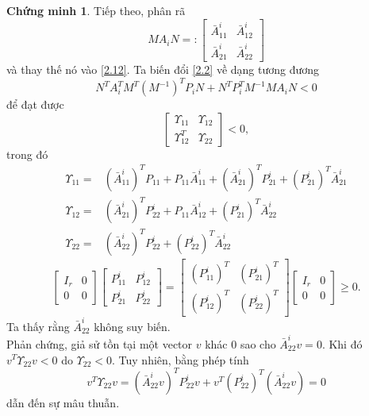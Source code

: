 \documentclass[12pt,a4paper]{report}
\theoremstyle{definition}
\newtheorem*{cv}{Chứng minh}
\theoremstyle{definition}
\numberwithin{dl}{chapter}
\numberwithin{vd}{chapter}
\numberwithin{corollary}{chapter}
\numberwithin{lemma}{chapter}
\numberwithin{md}{chapter}
\numberwithin{dn}{chapter}
\numberwithin{cy}{chapter}
\numberwithin{nx}{chapter}
\begin{document}
\begin{cv}
Tiếp theo, phân rã
\begin{equation}\label{2.11}
M A_{i} N=:\left[\begin{array}{cc}
\bar{A}_{11}^{i} & \bar{A}_{12}^{i} \\
\bar{A}_{21}^{i} & \bar{A}_{22}^{i}
\end{array}\right]
\end{equation}
và thay thế nó vào \eqref{2.12}. Ta biến đổi  \eqref{2.2} về dạng tương đương
\begin{equation}\label{2.12}
N^{T} A_{i}^{T} M^{T}\left(M^{-1}\right)^{T} P_{i} N+N^{T} P_{i}^{T} M^{-1} M A_{i} N<0 
\end{equation}
để đạt được
\begin{equation}\label{2.13}
\left[\begin{array}{ll}
\Upsilon_{11} & \Upsilon_{12} \\
\Upsilon_{12}^{T} & \Upsilon_{22}
\end{array}\right]<0,
\end{equation}
trong đó
$$
\begin{aligned}
\Upsilon_{11}=&\left(\bar{A}_{11}^{i}\right)^{T} P_{11}+P_{11} \bar{A}_{11}^{i} 
+\left(\bar{A}_{21}^{i}\right)^{T} P_{21}^{i}+\left(P_{21}^{i}\right)^{T} \bar{A}_{21}^{i} \\
\Upsilon_{12}=&\left(\bar{A}_{21}^{i}\right)^{T} P_{22}^{i}+P_{11} \bar{A}_{12}^{i}+\left(P_{21}^{i}\right)^{T} \bar{A}_{22}^{i} \\
\Upsilon_{22}=&\left(\bar{A}_{22}^{i}\right)^{T} P_{22}^{i}+\left(P_{22}^{i}\right)^{T} \bar{A}_{22}^{i}
\end{aligned}
$$
\begin{equation}\label{2.14}
\left[\begin{array}{ll}I_{r} & 0 \\0 & 0\end{array}\right]\left[\begin{array}{ll}P_{11}^{i} & P_{12}^{i} \\P_{21}^{i} & P_{22}^{i}\end{array}\right] =\left[\begin{array}{ll}\left(P_{11}^{i}\right)^{T} & \left(P_{21}^{i}\right)^{T} \\\left(P_{12}^{i}\right)^{T} & \left(P_{22}^{i}\right)^{T}\end{array}\right]\left[\begin{array}{cc}I_{r} & 0 \\0 & 0\end{array}\right] \geq 0.
\end{equation}
Ta thấy rằng $\bar{A}_{22}^{i}$ không suy biến. \\
Phản chứng, giả sử tồn tại một vector $v$ khác $0$ sao cho $\bar{A}_{22}^{i} v=0$. Khi đó $v^{T} \Upsilon_{22} v<0$ do $\Upsilon_{22}<0$. Tuy nhiên, bằng phép tính
\begin{equation}\label{2.15}
v^{T} \Upsilon_{22} v=\left(\bar{A}_{22}^{i} v\right)^{T} P_{22}^{i} v+v^{T}\left(P_{22}^{i}\right)^{T}\left(\bar{A}_{22}^{i} v\right)=0
\end{equation}
dẫn đến sự mâu thuẫn.


\end{cv}
\end{document}
